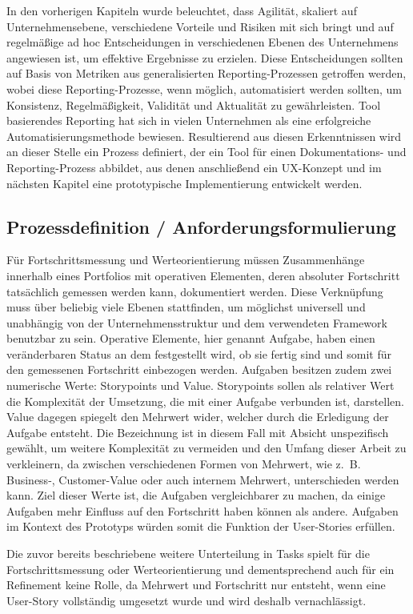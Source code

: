 In den vorherigen Kapiteln wurde beleuchtet, dass Agilität, skaliert auf Unternehmensebene, verschiedene Vorteile und  Risiken mit sich bringt und auf regelmäßige ad hoc Entscheidungen in verschiedenen Ebenen des Unternehmens angewiesen ist, um effektive Ergebnisse zu erzielen. Diese Entscheidungen sollten auf Basis von Metriken aus generalisierten Reporting-Prozessen getroffen werden, wobei diese Reporting-Prozesse, wenn möglich, automatisiert werden sollten, um Konsistenz, Regelmäßigkeit, Validität und Aktualität zu gewährleisten. Tool basierendes Reporting hat sich in vielen Unternehmen als eine erfolgreiche Automatisierungsmethode bewiesen.
Resultierend aus diesen Erkenntnissen wird an dieser Stelle ein Prozess definiert, der ein Tool für einen Dokumentations- und Reporting-Prozess abbildet, aus denen anschließend ein UX-Konzept und im nächsten Kapitel eine prototypische Implementierung entwickelt werden.

\subsection{Prozessdefinition / Anforderungsformulierung}
Für Fortschrittsmessung und Werteorientierung müssen Zusammenhänge innerhalb eines Portfolios mit operativen Elementen, deren absoluter Fortschritt tatsächlich gemessen werden kann, dokumentiert werden. Diese Verknüpfung muss über beliebig viele Ebenen stattfinden, um möglichst universell und unabhängig von der Unternehmensstruktur und dem verwendeten Framework benutzbar zu sein.
Operative Elemente, hier genannt Aufgabe, haben einen veränderbaren Status an dem festgestellt wird, ob sie fertig sind und somit für den gemessenen Fortschritt einbezogen werden. Aufgaben besitzen zudem zwei numerische Werte: Storypoints und Value. Storypoints sollen als relativer Wert die Komplexität der Umsetzung, die mit einer Aufgabe verbunden ist, darstellen. Value dagegen spiegelt den Mehrwert wider, welcher durch die Erledigung der Aufgabe entsteht. Die Bezeichnung ist in diesem Fall mit Absicht unspezifisch gewählt, um weitere Komplexität zu vermeiden und den Umfang dieser Arbeit zu verkleinern, da zwischen verschiedenen Formen von Mehrwert, wie z. B. Business-, Customer-Value oder auch internem Mehrwert, unterschieden werden kann. Ziel dieser Werte ist, die Aufgaben vergleichbarer zu machen, da einige Aufgaben mehr Einfluss auf den Fortschritt haben können als andere. Aufgaben im Kontext des Prototyps würden somit die Funktion der User-Stories erfüllen.

Die zuvor bereits beschriebene weitere Unterteilung in Tasks spielt für die Fortschrittsmessung oder Werteorientierung und dementsprechend auch für ein Refinement keine Rolle, da Mehrwert und Fortschritt nur entsteht, wenn eine User-Story vollständig umgesetzt wurde und wird deshalb vernachlässigt.

